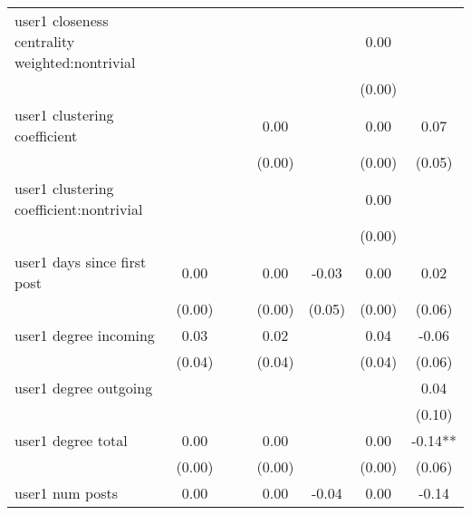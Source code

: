 \begin{table*}
\begin{center}
\begin{tabular}{lccccccc}
user1 closeness centrality weighted:nontrivial   &          &            &         &         &          & 0.00               &               \\
                                                 &          &            &         &         &          & (0.00)             &               \\
user1 clustering coefficient                     &          &            &         & 0.00    &          & 0.00               & 0.07          \\
                                                 &          &            &         & (0.00)  &          & (0.00)             & (0.05)        \\
user1 clustering coefficient:nontrivial          &          &            &         &         &          & 0.00               &               \\
                                                 &          &            &         &         &          & (0.00)             &               \\
user1 days since first post                      & 0.00     &            &         & 0.00    & -0.03    & 0.00               & 0.02          \\
                                                 & (0.00)   &            &         & (0.00)  & (0.05)   & (0.00)             & (0.06)        \\
user1 degree incoming                            & 0.03     &            &         & 0.02    &          & 0.04               & -0.06         \\
                                                 & (0.04)   &            &         & (0.04)  &          & (0.04)             & (0.06)        \\
user1 degree outgoing                            &          &            &         &         &          &                    & 0.04          \\
                                                 &          &            &         &         &          &                    & (0.10)        \\
user1 degree total                               & 0.00     &            &         & 0.00    &          & 0.00               & -0.14**       \\
                                                 & (0.00)   &            &         & (0.00)  &          & (0.00)             & (0.06)        \\
user1 num posts                                  & 0.00     &            &         & 0.00    & -0.04    & 0.00               & -0.14         \\

\end{tabular}
\end{center}
\end{table*}
